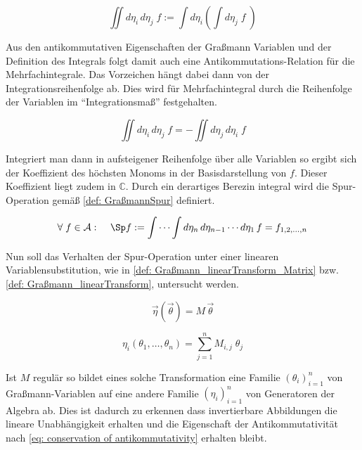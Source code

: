 \begin{equation}
\iint d \eta_{i}\, d \eta_{j}\; f := \int d \eta_{i} \left( \int d \eta_{j}\; f\; \right)
\end{equation}

\noindent Aus den antikommutativen Eigenschaften der Graßmann Variablen und der Definition des Integrals folgt damit auch eine Antikommutations-Relation für die Mehrfachintegrale. Das Vorzeichen hängt dabei dann von der Integrationsreihenfolge ab. Dies wird für Mehrfachintegral durch die Reihenfolge der Variablen im ``Integrationsmaß'' festgehalten.

\begin{equation}
\iint d \eta_{i}\, d \eta_{j}\; f = - \iint d \eta_{j}\, d \eta_{i}\; f
\end{equation}

\noindent Integriert man dann in aufsteigener Reihenfolge über alle Variablen so ergibt sich der Koeffizient des höchsten Monoms in der Basisdarstellung von $f$. Dieser Koeffizient liegt zudem in $\mathbb C$. Durch ein derartiges Berezin integral wird die Spur-Operation gemäß \eqref{def: GraßmannSpur} definiert. 

\begin{grayframe}[frametitle = {Definition: Spur-Operation}]
    \begin{equation} \label{def: GraßmannSpur}
        \forall \;f\in \mathcal A : \;\;\;\; \Sp f := \int \cdots \int d\eta_n\,d\eta_{n-1}\cdots d\eta_1\, f = f_{1,2,\dots,n}
    \end{equation}
\end{grayframe}

\noindent Nun soll das Verhalten der Spur-Operation unter einer linearen Variablensubstitution, wie in \eqref{def: Graßmann_linearTransform_Matrix} bzw. \eqref{def: Graßmann_linearTransform}, untersucht werden. 

\begin{equation} \label{def: Graßmann_linearTransform_Matrix}
    \vec{\eta}\left(\vec{\theta}\right) = M\,\vec{\theta}
\end{equation}

\begin{equation} \label{def: Graßmann_linearTransform}
    \eta_i\left( \theta_1,\dots,\theta_n \right) = \sum_{j=1}^n M_{i,j}\; \theta_j
\end{equation}

\noindent Ist $M$ regulär so bildet eines solche Transformation eine Familie $\left(\theta_i\right)_{i = 1}^n$ von Graßmann-Variablen auf eine andere Familie $\left(\eta_i\right)_{i = 1}^n$ von Generatoren der Algebra ab. Dies ist dadurch zu erkennen dass invertierbare Abbildungen die lineare Unabhängigkeit erhalten und die Eigenschaft der Antikommutativität nach \eqref{eq: conservation of antikommutativity} erhalten bleibt.

